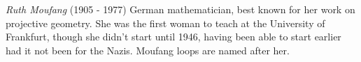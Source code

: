 \documentclass[12pt]{article}
\begin{document}
\emph{Ruth Moufang} (1905 - 1977) German mathematician, best known for her work on projective geometry. She was the first woman to teach at the University of Frankfurt, though she didn't start until 1946, having been able to start earlier had it not been for the Nazis. Moufang loops are named after her.
\end{document}
